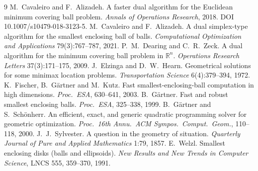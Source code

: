 \documentclass[10pt,a4paper]{article}
\theoremstyle{plain}
\newcommand{\R}{\mathbb{R}}
\begin{document}
\begin{thebibliography}{9}
\footnotesize
\setlength{\itemsep}{0pt}
\setlength{\parskip}{0pt}
 M.~Cavaleiro and F.~Alizadeh. A faster dual algorithm
  for the Euclidean minimum covering ball problem. \emph{Annals of Operations
  Research}, 2018. DOI 10.1007/s10479-018-3123-5.
 M.~Cavaleiro and F.~Alizadeh. A dual simplex-type
  algorithm for the smallest enclosing ball of balls. \emph{Computational
  Optimization and Applications} 79(3):767--787, 2021.
 P.~M.~Dearing and C.~R.~Zeck. A dual algorithm for the
  minimum covering ball problem in $\R^n$. \emph{Operations Research Letters}
  37(3):171--175, 2009.
 J.~Elzinga and D.~W.~Hearn. Geometrical solutions for some
  minimax location problems. \emph{Transportation Science} 6(4):379--394, 1972.
 K.~Fischer, B.~G\"artner and M.~Kutz. Fast
  smallest-enclosing-ball computation in high dimensions. \emph{Proc.\ ESA},
  630--641, 2003.
 B.~G\"artner. Fast and robust smallest enclosing balls.
  \emph{Proc.\ ESA}, 325--338, 1999.
 B.~G\"artner and S.~Sch\"onherr. An efficient, exact,
  and generic quadratic programming solver for geometric optimization.
  \emph{Proc.\ 16th Annu.\ ACM Sympos.\ Comput.\ Geom.}, 110--118, 2000.
 J.~J.~Sylvester. A question in the geometry of
  situation. \emph{Quarterly Journal of Pure and Applied Mathematics} 1:79, 1857.
 E.~Welzl. Smallest enclosing disks (balls and ellipsoids).
  \emph{New Results and New Trends in Computer Science}, LNCS 555, 359--370, 1991.
\end{thebibliography}
\end{document}
